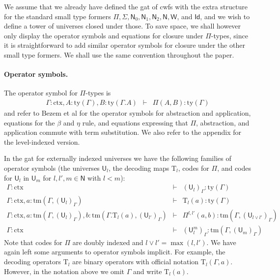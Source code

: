 \documentclass[11pt,a4paper]{article}
\theoremstyle{definition}
\newcommand{\Id}{\mathsf{Id}}
\newcommand{\NN}{\mathsf{N}}
\newcommand{\UU}{\mathsf{U}}
\def\NN{\mathsf{N}}
\def\UU{\mathsf{U}}
\newcommand{\N}{\mathsf{N}}
\def\Pihat{\Pi}
\newcommand{\ctx}{\mathrm{ctx}}
\newcommand{\ty}{\mathrm{ty}}
\newcommand{\tm}{\mathrm{tm}}
\def\U{\mathsf{U}}
\newcommand{\Ta}{\mathrm{T}}
\def\W{\mathsf{W}}
\begin{document}
We assume that we already have defined the gat of cwfs with the extra structure for the standard small type formers $\Pi, \Sigma, \N_0, \N_1, \N_2, \N, \W$, and $\Id$, and we wish to define a tower of universes closed under those. To save space, we shall however only display the operator symbols and equations for closure under $\Pi$-types, since it is straightforward to add similar operator symbols for closure under the other small type formers. We shall use the same convention throughout the paper.

\paragraph{Operator symbols.}
The operator symbol for $\Pi$-types is
\begin{eqnarray*}
\Gamma : \ctx, A : \ty(\Gamma), B : \ty(\Gamma.A) &\vdash& \Pi(A,B) : \ty(\Gamma)
\end{eqnarray*}
and refer to Bezem et al \cite{bezem:hofmann} for the operator symbols for abstraction and application, equations for the $\beta$ and $\eta$ rule, and equations expressing that $\Pi$, abstraction, and application commute with term substitution. We also refer to the appendix for the level-indexed version.

In the gat for externally indexed universes we have the following families of operator symbols (the universes $\UU_l$, the decoding maps $\Ta_l$, codes for $\Pi$, and codes for $\UU_l$ in $\UU_m$ for $l, l' , m \in \NN$ with $l < m$):
\begin{eqnarray*}
\Gamma : \ctx &\vdash& (\U_{l})_\Gamma : \ty(\Gamma)\\
\Gamma : \ctx, a : \tm(\Gamma,(\U_{l})_\Gamma) &\vdash& {\Ta_{l}}(a) : \ty(\Gamma)\\
\Gamma : \ctx,
a : \tm(\Gamma,(\U_{l})_\Gamma),
b :  \tm(\Gamma . \Ta_{l}(a), (\U_{l'})_\Gamma)
&\vdash&
 \Pihat^{l,l'}(a,b) : \tm(\Gamma,(\U_{l \vee l'})_\Gamma)\\
 \Gamma : \ctx&\vdash&(\UU^m_l)_\Gamma: \tm(\Gamma,(\UU_{m})_\Gamma)
\end{eqnarray*}
Note that codes for $\Pi$ are doubly indexed and $l \vee l' = \max(l,l')$.
We have again left some arguments to operator symbols implicit. For example, the decoding operators $\Ta_l$ are binary operators with official notation $\Ta_l(\Gamma,a)$. However, in the notation above we omit $\Gamma$ and write $\Ta_l(a)$.
\end{document}
